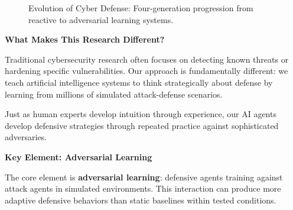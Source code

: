 \documentclass[12pt,oneside,a4paper]{article}
\theoremstyle{definition}
\theoremstyle{plain}
\begin{document}
\begin{figure}[H]
\centering
{}
\caption{Evolution of Cyber Defense: Four-generation progression from reactive to adversarial learning systems.}
\label{fig:evolution}
\end{figure}

\textbf{What Makes This Research Different?}

Traditional cybersecurity research often focuses on detecting known threats or hardening specific vulnerabilities. Our approach is fundamentally different: we teach artificial intelligence systems to think strategically about defense by learning from millions of simulated attack-defense scenarios. 

Just as human experts develop intuition through experience, our AI agents develop defensive strategies through repeated practice against sophisticated adversaries.

\textbf{Key Element: Adversarial Learning}

The core element is \textbf{adversarial learning}: defensive agents training against attack agents in simulated environments. This interaction can produce more adaptive defensive behaviors than static baselines within tested conditions.
\end{document}
